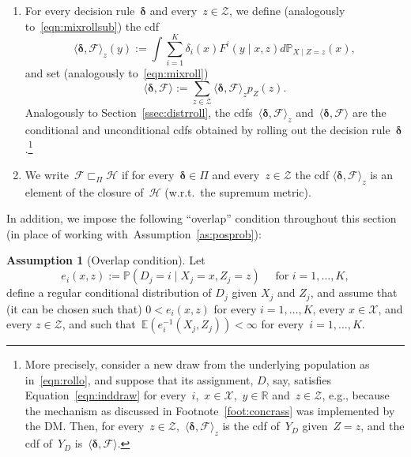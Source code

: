 \documentclass[11pt, a4paper]{article}
\newcommand{\R}{\mathbb{R}}
\theoremstyle{definition}
\newtheorem{assumption}{Assumption}[section]
\begin{document}
\begin{enumerate}
\item For every decision rule~$\bm{\delta}$ and every~$z \in \mathcal{Z}$, we define (analogously to~\eqref{eqn:mixrollsub}) the cdf
\begin{equation}\label{eqn:langrang}
\langle \bm{\delta}, \mathcal{F} \rangle_z(y) := \int \sum_{i = 1}^K \delta_i(x) F^i( y \mid x, z) d\mathbb{P}_{X \mid Z = z}(x),%
\end{equation}
and set (analogously to~\eqref{eqn:mixroll})~$$\langle \bm{\delta}, \mathcal{F} \rangle := \sum_{z \in \mathcal{Z}} \langle \bm{\delta}, \mathcal{F} \rangle_z p_{Z}(z).$$ Analogously to Section~\ref{ssec:distrroll}, the cdfs~$\langle \bm{\delta}, \mathcal{F} \rangle_z$ and~$\langle \bm{\delta}, \mathcal{F} \rangle$ are the conditional and unconditional cdfs obtained by rolling out the decision rule~$\bm{\delta}$.\footnote{More precisely, consider a new draw from the underlying population as in~\eqref{eqn:rollo}, and suppose that its assignment, $D$, say, satisfies Equation~\eqref{eqn:inddraw} for every~$i$,~$x \in \mathcal{X}$,~$y \in \R$ and~$z \in \mathcal{Z}$, e.g., because the mechanism as discussed in Footnote~\ref{foot:concrass} was implemented by the DM. Then, for every~$z \in \mathcal{Z}$,~$\langle \bm{\delta}, \mathcal{F} \rangle_z$ is the cdf of~$Y_D$ given~$Z = z$, and the cdf of~$Y_D$ is~$\langle \bm{\delta}, \mathcal{F} \rangle$.}
\item  We write~$\mathcal{F} \sqsubset_{\Pi} \mathscr{H}$ if for every~$\bm{\delta} \in \Pi$ and every~$z \in \mathcal{Z}$ the cdf $\langle \bm{\delta}, \mathcal{F}\rangle_z$ is an element of the closure of~$\mathscr{H}$ (w.r.t.~the supremum metric).
\end{enumerate}
%
In addition, we impose the following ``overlap'' condition throughout this section (in place of working with~Assumption~\ref{as:posprob}):
%
\begin{assumption}[Overlap condition]\label{ass:knownprop}
Let $$e_i(x, z) := \mathbb{P}(D_j = i \mid X_j = x, Z_j = z) \quad \text{ for } i = 1, \hdots, K,$$ define a regular conditional distribution of $D_j$ given $X_j$ and $Z_j$, and assume that (it can be chosen such that) $0 < e_i(x, z)$ for every $i = 1, \hdots, K$, every $x \in \mathcal{X}$, and every $z \in \mathcal{Z}$, and such that~$\mathbb{E}(e_i^{-1}(X_j, Z_j)) < \infty$ for every~$i = 1, \hdots, K$.
\end{assumption}
\end{document}
